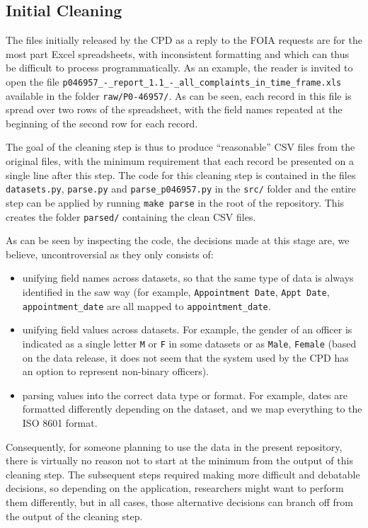 \subsection{Initial Cleaning}

The files initially released by the CPD as a reply to the FOIA requests are for
the most part Excel spreadsheets, with inconsistent formatting and which can
thus be difficult to process programmatically. As an example, the reader is
invited to open the file
\texttt{p046957\_-\_report\_1.1\_-\_all\_complaints\_in\_time\_frame.xls}
available in the folder \texttt{raw/P0-46957/}. As can be seen, each record in
this file is spread over two rows of the spreadsheet, with the field names
repeated at the beginning of the second row for each record.

The goal of the cleaning step is thus to produce ``reasonable'' CSV files from
the original files, with the minimum requirement that each record be presented
on a single line after this step. The code for this cleaning step is contained
in the files \texttt{datasets.py}, \texttt{parse.py} and
\texttt{parse\_p046957.py} in the \texttt{src/} folder and the entire step can
be applied by running \texttt{make parse} in the root of the repository. This
creates the folder \texttt{parsed/} containing the clean CSV files.

As can be seen by inspecting the code, the decisions made at this stage are, we
believe, uncontroversial as they only consists of:
\begin{itemize}
	\item unifying field names across datasets, so that the same type of data
		is always identified in the saw way (for example, \texttt{Appointment
		Date}, \texttt{Appt Date}, \texttt{appointment\_date} are all mapped to
		\texttt{appointment\_date}.
	\item unifying field values across datasets. For example, the gender of an
		officer is indicated as a single letter \texttt{M} or \texttt{F} in
		some datasets or as \texttt{Male}, \texttt{Female} (based on the data
		release, it does not seem that the system used by the CPD has an option
		to represent non-binary officers).
	\item parsing values into the correct data type or format. For example,
		dates are formatted differently depending on the dataset, and we map
		everything to the ISO 8601 format.
\end{itemize}

Consequently, for someone planning to use the data in the present repository,
there is virtually no reason not to start at the minimum from the output of
this cleaning step. The subsequent steps required making more difficult and
debatable decisions, so depending on the application, researchers might want to
perform them differently, but in all cases, those alternative decisions can
branch off from the output of the cleaning step.

